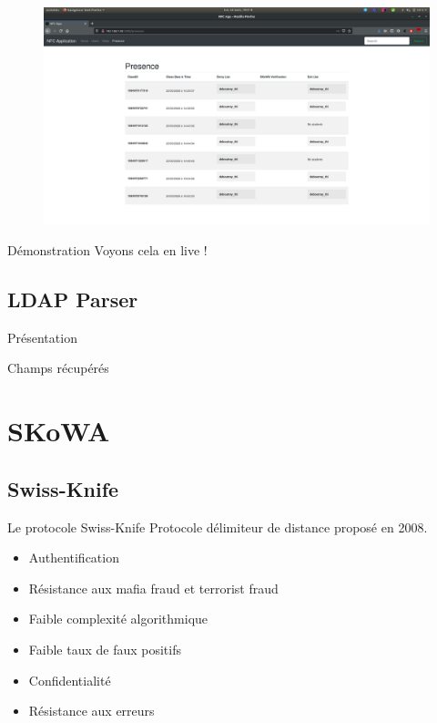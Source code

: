 \documentclass[aspectratio=169]{beamer}
\begin{document}
\begin{frame}
    \begin{figure}
        \centering
        \includegraphics[height=.9\textheight]{../assets/capture_page_presence.png}
    \end{figure}
\end{frame}

\begin{frame}{Démonstration}
    Voyons cela en live ! 
\end{frame}

\subsection{LDAP Parser}

\begin{frame}{Présentation}

\end{frame}

\begin{frame}{Champs récupérés}

\end{frame}

\section{SKoWA}

\subsection{Swiss-Knife}

\begin{frame}{Le protocole Swiss-Knife}
    Protocole délimiteur de distance proposé en 2008. \cite{SwissKnife}

    \bigskip

    \begin{itemize}
        \item Authentification
        \item Résistance aux mafia fraud et terrorist fraud
        \item Faible complexité algorithmique
        \item Faible taux de faux positifs
        \item Confidentialité
        \item Résistance aux erreurs
    \end{itemize}
\end{frame}
\end{document}
